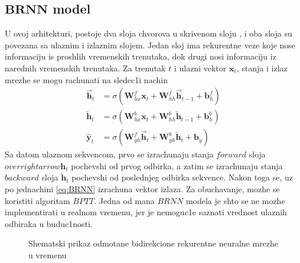 \documentclass[a4paper, openany, oneside, 11pt]{book}
\begin{document}
\subsection[$BRNN$ model]{$\mathbf{BRNN}$ model}
U ovoj arhitekturi, postoje dva sloja chvorova u skrivenom sloju , i oba sloja su povezana sa ulaznim i izlaznim slojem. Jedan sloj ima rekurentne veze koje nose informaciju is proshlih vremenskih trenutaka, dok drugi nosi informaciju iz narednih vremenskih trenutaka. Za trenutak $t$ i ulazni vektor $\mathbf{x}_{t}$, stanja i izlaz mrezhe se mogu rachunati na sledec1i nachin
\begin{align}
\overrightarrow{\mathbf{h}}_t &= \sigma\left(\mathbf{W}^f_{hx}\mathbf{x}_t+\mathbf{W}^f_{hh}\overrightarrow{\mathbf{h}}_{t-1}+\mathbf{b}_h^f\right)\\
\overleftarrow{\mathbf{h}}_t &= \sigma\left(\mathbf{W}^b_{hx}\mathbf{x}_t+\mathbf{W}^b_{hh}\overleftarrow{\mathbf{h}}_{t-1}+\mathbf{b}_h^b\right)\\
\mathbf{\hat{y}}_t&= \sigma\left(\mathbf{W}^f_{yh}\overrightarrow{\mathbf{h}}_t +\mathbf{W}^b_{yh}\overleftarrow{\mathbf{h}}_t+\mathbf{b}_y\right) \label{eq:BRNN}
\end{align}
Sa datom ulaznom sekvencom, prvo se izrachunaju stanja $forward$ sloja $overrightarrow{\mathbf{h}}_t$ pochevshi od prvog odbirka, a zatim se izrachunaju stanja $backward$ sloja $\overleftarrow{\mathbf{h}}_t$ pochevshi od poslednjeg odbirka sekvence. Nakon toga se, uz po jednachini \ref{eq:BRNN} izrachuna vektor izlaza. Za obuchavanje, mozhe se koristiti algoritam $BPTT$. Jedna od mana $BRNN$ modela je shto se ne mozhe implementirati u realnom vremenu, jer je nemoguc1e saznati vrednost ulaznih odbiraka u buduc1nosti.
\newpage
\begin{figure}[!h]
\hspace*{0.2\linewidth}
\caption{Shemat\-ski prikaz odmotane bidirekcione rekurentne neuralne mrezhe u vremenu}
\label{fig:12}
\end{figure}
\end{document}
